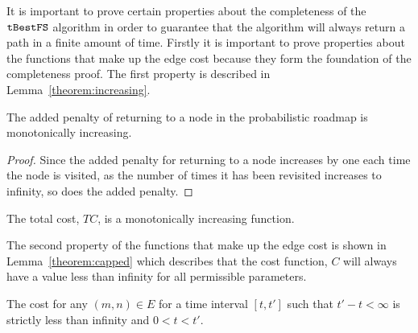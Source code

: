 It is important to prove certain properties about the completeness of the
$\Acronym{tBestFS}$ algorithm in order to guarantee that the algorithm will
always return a path in a finite amount of time. Firstly it is important to
prove properties about the functions that make up the edge cost because they
form the foundation of the completeness proof. The first property is described
in Lemma~\ref{theorem:increasing}.

\begin{lemma}

    \label{theorem:increasing}

    The added penalty of returning to a node in the probabilistic roadmap is
    monotonically increasing.

\end{lemma}

\begin{proof}

    Since the added penalty for returning to a node increases by one each time
    the node is visited, as the number of times it has been revisited increases
    to infinity, so does the added penalty.

\end{proof}

\begin{corollary}

    The total cost, $TC$, is a monotonically increasing function.

\end{corollary}

The second property of the functions that make up the edge cost is shown in
Lemma~\ref{theorem:capped} which describes that the cost function, $C$ will
always have a value less than infinity for all permissible parameters.

\begin{lemma}

    \label{theorem:capped}

    The cost for any $(m, n) \in E$ for a time interval $[t, t']$ such that $t'
    - t < \infty$ is strictly less than infinity and $0 < t < t'$.

\end{lemma}

